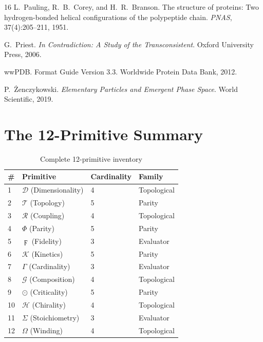 \documentclass[11pt,a4paper,twocolumn]{article}
\begin{document}
\begin{thebibliography}{16}
L.~Pauling, R.~B.~Corey, and H.~R.~Branson.
\newblock The structure of proteins: Two hydrogen-bonded helical configurations of the polypeptide chain.
\newblock \emph{PNAS}, 37(4):205--211, 1951.

G.~Priest.
\newblock \emph{In Contradiction: A Study of the Transconsistent}.
\newblock Oxford University Press, 2006.

wwPDB.
 Format Guide Version 3.3.
\newblock Worldwide Protein Data Bank, 2012.

P.~{\.Z}enczykowski.
\newblock \emph{Elementary Particles and Emergent Phase Space}.
\newblock World Scientific, 2019.

\end{thebibliography}


\appendix

\section{The 12-Primitive Summary}

\begin{table}[h]
\centering
\caption{Complete 12-primitive inventory}
\small
\begin{tabular}{llll}
\toprule
\# & Primitive & Cardinality & Family \\
\midrule
1 & $\mathcal{D}$ (Dimensionality) & 4 & Topological \\
2 & $\mathcal{T}$ (Topology) & 5 & Parity \\
3 & $\mathcal{R}$ (Coupling) & 4 & Topological \\
4 & $\Phi$ (Parity) & 5 & Parity \\
5 & $\digamma$ (Fidelity) & 3 & Evaluator \\
6 & $\mathcal{K}$ (Kinetics) & 5 & Parity \\
7 & $\Gamma$ (Cardinality) & 3 & Evaluator \\
8 & $\mathcal{G}$ (Composition) & 4 & Topological \\
9 & $\odot$ (Criticality) & 5 & Parity \\
10 & $\mathcal{H}$ (Chirality) & 4 & Topological \\
11 & $\Sigma$ (Stoichiometry) & 3 & Evaluator \\
12 & $\Omega$ (Winding) & 4 & Topological \\
\bottomrule
\end{tabular}
\end{table}
\end{document}
